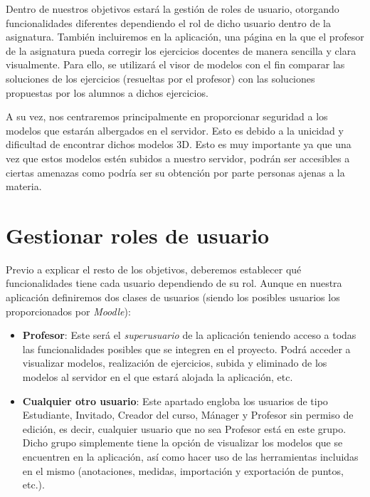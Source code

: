 
Dentro de nuestros objetivos estará la gestión de roles de usuario, otorgando funcionalidades diferentes dependiendo el rol de dicho usuario dentro de la asignatura. También incluiremos en la aplicación, una página en la que el profesor de la asignatura pueda corregir los ejercicios docentes de manera sencilla y clara visualmente. Para ello, se utilizará el visor de modelos con el fin comparar las soluciones de los ejercicios (resueltas por el profesor) con las soluciones propuestas por los alumnos a dichos ejercicios.

A su vez, nos centraremos principalmente en proporcionar seguridad a los modelos que estarán albergados en el servidor. Esto es debido a la unicidad y dificultad de encontrar dichos modelos 3D. Esto es muy importante ya que una vez que estos modelos estén subidos a nuestro servidor, podrán ser accesibles a ciertas amenazas como podría ser su obtención por parte personas ajenas a la materia.

\section{Gestionar roles de usuario}
Previo a explicar el resto de los objetivos, deberemos establecer qué funcionalidades tiene cada usuario dependiendo de su rol. Aunque en nuestra aplicación definiremos dos clases de usuarios (siendo los posibles usuarios los proporcionados por \textit{Moodle}):

\begin{itemize}
	\item \textbf{Profesor}: Este será el \textit{superusuario} de la aplicación teniendo acceso a todas las funcionalidades posibles que se integren en el proyecto. Podrá acceder a visualizar modelos, realización de ejercicios, subida y eliminado de los modelos al servidor en el que estará alojada la aplicación, etc.
	
	\item \textbf{Cualquier otro usuario}: Este apartado engloba los usuarios de tipo Estudiante, Invitado, Creador del curso, Mánager y Profesor sin permiso de edición, es decir, cualquier usuario que no sea Profesor está en este grupo. Dicho grupo simplemente tiene la opción de visualizar los modelos que se encuentren en la aplicación, así como hacer uso de las herramientas incluidas en el mismo (anotaciones, medidas, importación y exportación de puntos, etc.).
\end{itemize}

